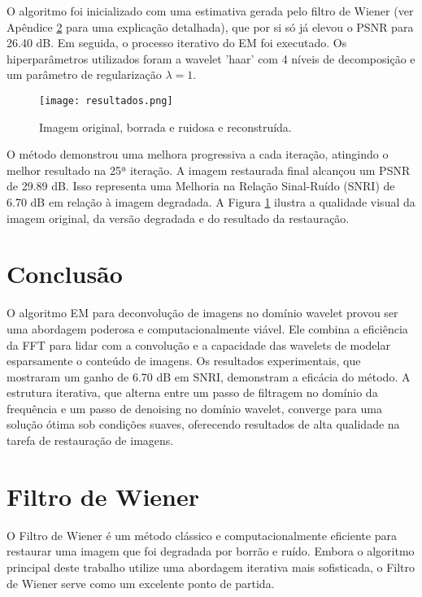 \documentclass[12pt]{article}
\begin{document}
O algoritmo foi inicializado com uma estimativa gerada pelo filtro de Wiener (ver Apêndice \ref{ap:wiener} para uma explicação detalhada), que por si só já elevou o PSNR para 26.40 dB. Em seguida, o processo iterativo do EM foi executado. Os hiperparâmetros utilizados foram a wavelet 'haar' com 4 níveis de decomposição e um parâmetro de regularização $\lambda=1$.

\begin{figure}[H]
    \centering
    \texttt{[image: resultados.png]}
    \caption{Imagem original, borrada e ruidosa e reconstruída.}
    \label{fig:resultados}
\end{figure}

O método demonstrou uma melhora progressiva a cada iteração, atingindo o melhor resultado na 25ª iteração. A imagem restaurada final alcançou um PSNR de 29.89 dB. Isso representa uma Melhoria na Relação Sinal-Ruído (SNRI) de 6.70 dB em relação à imagem degradada. A Figura \ref{fig:resultados} ilustra a qualidade visual da imagem original, da versão degradada e do resultado da restauração.
\section{Conclusão}

O algoritmo EM para deconvolução de imagens no domínio wavelet provou ser uma abordagem poderosa e computacionalmente viável. Ele combina a eficiência da FFT para lidar com a convolução e a capacidade das wavelets de modelar esparsamente o conteúdo de imagens. Os resultados experimentais, que mostraram um ganho de 6.70 dB em SNRI, demonstram a eficácia do método. A estrutura iterativa, que alterna entre um passo de filtragem no domínio da frequência e um passo de denoising no domínio wavelet, converge para uma solução ótima sob condições suaves, oferecendo resultados de alta qualidade na tarefa de restauração de imagens.
\printbibliography

\appendix
\section{Filtro de Wiener}\label{ap:wiener}

O Filtro de Wiener é um método clássico e computacionalmente eficiente para restaurar uma imagem que foi degradada por borrão e ruído. Embora o algoritmo principal deste trabalho utilize uma abordagem iterativa mais sofisticada, o Filtro de Wiener serve como um excelente ponto de partida.
\end{document}
